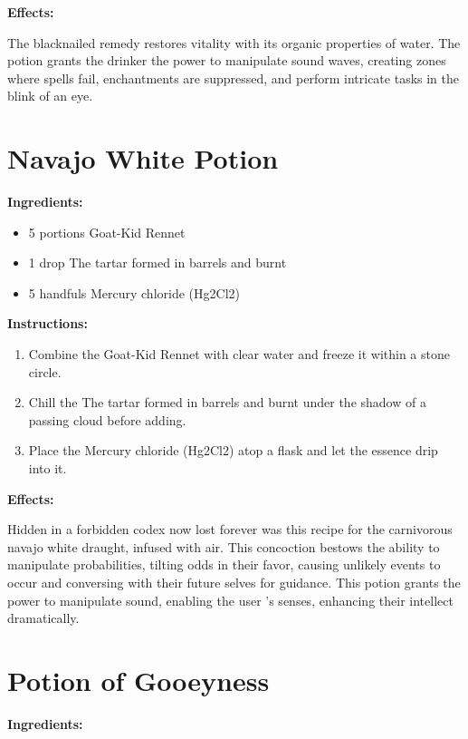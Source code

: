\documentclass{article}
\begin{document}
\textbf{Effects:}

The blacknailed remedy restores vitality with its organic properties of water. The potion grants the drinker the power to manipulate sound waves, creating zones where spells fail, enchantments are suppressed, and perform intricate tasks in the blink of an eye.

\newpage
\section*{Navajo White Potion}

\textbf{Ingredients:}

\begin{itemize}
  \item 5 portions Goat-Kid  Rennet
  \item 1 drop The tartar formed in barrels and burnt
  \item 5 handfuls Mercury chloride (Hg2Cl2)
\end{itemize}

\textbf{Instructions:}

\begin{enumerate}
  \item Combine the Goat-Kid  Rennet with clear water and freeze it within a stone circle.
  \item Chill the The tartar formed in barrels and burnt under the shadow of a passing cloud before adding.
  \item Place the Mercury chloride (Hg2Cl2) atop a flask and let the essence drip into it.
\end{enumerate}

\textbf{Effects:}

Hidden in a forbidden codex now lost forever was this recipe for the carnivorous navajo white draught, infused with air. This concoction bestows the ability to manipulate probabilities, tilting odds in their favor, causing unlikely events to occur and conversing with their future selves for guidance. This potion grants the power to manipulate sound, enabling the user 's senses, enhancing their intellect dramatically.

\newpage
\section*{Potion of Gooeyness}

\textbf{Ingredients:}
\end{document}
